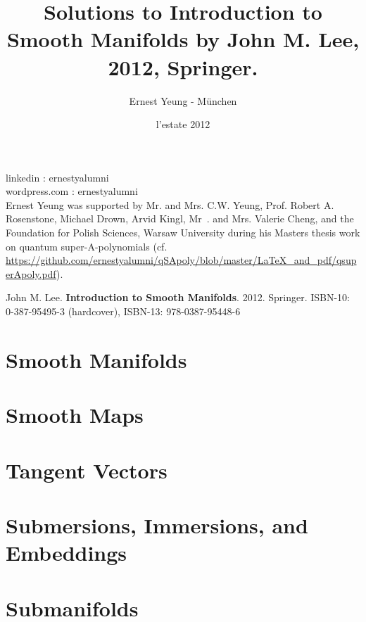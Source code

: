 \documentclass[twoside]{amsart}
\title{Solutions to \textbf{Introduction to Smooth Manifolds} by John M. Lee, 2012, Springer.  }
\author{
  Ernest Yeung - M\"{u}nchen
       }
\date{l'estate 2012}
\theoremstyle{plain}
\theoremstyle{definition}
\begin{document}

\maketitle

\noindent linkedin     : ernestyalumni \\
wordpress.com          : ernestyalumni \\


Ernest Yeung was supported by Mr. and Mrs. C.W. Yeung, Prof. Robert A. Rosenstone, Michael Drown, Arvid Kingl, Mr\
. and Mrs. Valerie Cheng, and the Foundation for Polish Sciences, Warsaw University during his Masters thesis work on quantum super-A-polynomials (cf. \href{github:qsApoly}{https://github.com/ernestyalumni/qSApoly/blob/master/LaTeX\_and\_pdf/qsuperApoly.pdf}).                  

John M. Lee.  \textbf{Introduction to Smooth Manifolds}.  2012. Springer.   ISBN-10: 0-387-95495-3 (hardcover), ISBN-13: 978-0387-95448-6  \\

\tableofcontents

\section{Smooth Manifolds}




\section{Smooth Maps}






\section{Tangent Vectors}




\section{Submersions, Immersions, and Embeddings}


\section{Submanifolds}

\end{document}
